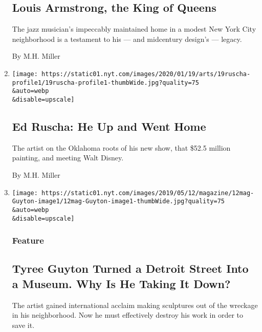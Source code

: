 \begin{enumerate}
{  \subsection{Louis Armstrong, the King of
  Queens}\label{louis-armstrong-the-king-of-queens}}

  The jazz musician's impeccably maintained home in a modest New York
  City neighborhood is a testament to his --- and midcentury design's
  --- legacy.

  By M.H. Miller
\item
  \href{/2020/01/15/arts/design/ed-ruscha.html}{}

  \texttt{[image: https://static01.nyt.com/images/2020/01/19/arts/19ruscha-profile1/19ruscha-profile1-thumbWide.jpg?quality=75\\\&auto=webp\\\&disable=upscale]}

  \hypertarget{ed-ruscha-he-up-and-went-home}{%
  \subsection{Ed Ruscha: He Up and Went
  Home}\label{ed-ruscha-he-up-and-went-home}}

  The artist on the Oklahoma roots of his new show, that \$52.5 million
  painting, and meeting Walt Disney.

  By M.H. Miller
\item
  \href{/2019/05/09/magazine/tyree-guyton-art-detroit.html}{}

  \texttt{[image: https://static01.nyt.com/images/2019/05/12/magazine/12mag-Guyton-image1/12mag-Guyton-image1-thumbWide.jpg?quality=75\\\&auto=webp\\\&disable=upscale]}

  \hypertarget{feature}{%
  \subsubsection{Feature}\label{feature}}

  \hypertarget{tyree-guyton-turned-a-detroit-street-into-a-museum-why-is-he-taking-it-down}{%
  \subsection{Tyree Guyton Turned a Detroit Street Into a Museum. Why Is
  He Taking It
  Down?}\label{tyree-guyton-turned-a-detroit-street-into-a-museum-why-is-he-taking-it-down}}

  The artist gained international acclaim making sculptures out of the
  wreckage in his neighborhood. Now he must effectively destroy his work
  in order to save it.


\end{enumerate}
